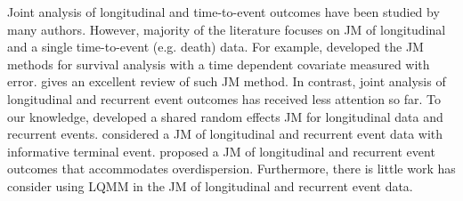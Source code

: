 Joint analysis of longitudinal and time-to-event outcomes have been studied by many authors. However, majority of the literature focuses on JM of longitudinal and a single time-to-event (e.g. death) data. For example, \cite{self1992modeling, tsiatis1995modeling, wulfsohn1997joint} developed the JM methods for survival analysis with a time dependent covariate measured with error. \cite{tsiatis2004joint} gives an excellent review of such JM method. In contrast, joint analysis of longitudinal and recurrent event outcomes has received less attention so far. To our knowledge, \cite{henderson2000joint} developed a shared random effects JM for longitudinal data and recurrent events. \cite{kim2012joint} considered a JM of longitudinal and recurrent event data with informative terminal event. \cite{efendi2013joint} proposed a JM of longitudinal and recurrent event outcomes that accommodates overdispersion. Furthermore, there is little work has consider using LQMM in the JM of longitudinal and recurrent event data.


